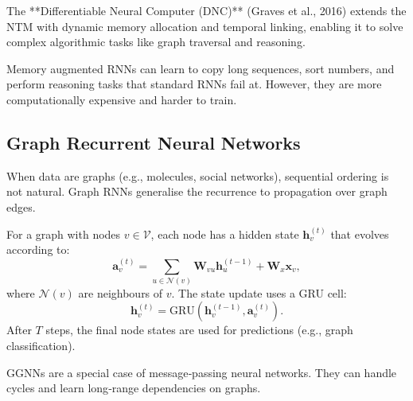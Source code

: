 \documentclass{tufte-handout}
\begin{document}
The **Differentiable Neural Computer (DNC)** (Graves et al., 2016) extends the NTM with dynamic memory allocation and temporal linking, enabling it to solve complex algorithmic tasks like graph traversal and reasoning.

\begin{marginfigure}
\centering
{}
\caption{Neural Turing Machine: an RNN controller accesses an external memory matrix.}
\end{marginfigure}

Memory augmented RNNs can learn to copy long sequences, sort numbers, and perform reasoning tasks that standard RNNs fail at. However, they are more computationally expensive and harder to train.

\subsection{Graph Recurrent Neural Networks}

When data are graphs (e.g., molecules, social networks), sequential ordering is not natural. Graph RNNs generalise the recurrence to propagation over graph edges.

\begin{defn}
    For a graph with nodes $v \in \mathcal{V}$, each node has a hidden state $\mathbf{h}_v^{(t)}$ that evolves according to:
    \[
    \mathbf{a}_v^{(t)} = \sum_{u \in \mathcal{N}(v)} \mathbf{W}_{vu} \mathbf{h}_u^{(t-1)} + \mathbf{W}_x \mathbf{x}_v,
    \]
    where $\mathcal{N}(v)$ are neighbours of $v$. The state update uses a GRU cell:
    \[
    \mathbf{h}_v^{(t)} = \text{GRU}(\mathbf{h}_v^{(t-1)}, \mathbf{a}_v^{(t)}).
    \]
    After $T$ steps, the final node states are used for predictions (e.g., graph classification).
\end{defn}

GGNNs are a special case of message‑passing neural networks. They can handle cycles and learn long‑range dependencies on graphs.

\begin{marginfigure}
\centering
{}
\caption{In a Graph RNN, each node’s state is updated using messages from neighbours.}
\end{marginfigure}
\end{document}
